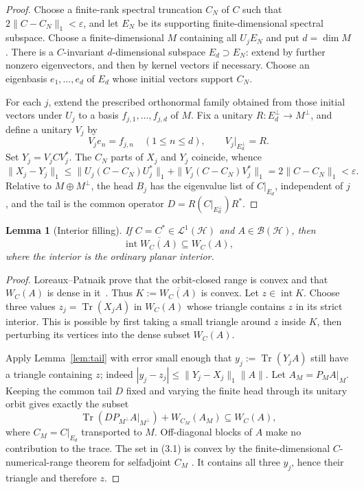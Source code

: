\documentclass[11pt]{article}
\newtheorem{lemma}[theorem]{Lemma}
\newcommand{\HH}{\mathcal H}
\newcommand{\B}{\mathcal B}
\newcommand{\Lone}{\mathcal L^1}
\newcommand{\Tr}{\operatorname{Tr}}
\newcommand{\clos}[1]{\overline{#1}}
\begin{document}
\begin{proof}
Choose a finite-rank spectral truncation $C_N$ of $C$ such that
$2\|C-C_N\|_1<\varepsilon$, and let $E_N$ be its supporting
finite-dimensional spectral subspace.  Choose a finite-dimensional $M$
containing all $U_jE_N$ and put $d=\dim M$.  There is a $C$-invariant
$d$-dimensional subspace $E_d\supset E_N$: extend by further nonzero
eigenvectors, and then by kernel vectors if necessary.  Choose an eigenbasis
$e_1,\ldots,e_d$ of $E_d$ whose initial vectors support $C_N$.

For each $j$, extend the prescribed orthonormal family obtained from those
initial vectors under $U_j$ to a basis $f_{j,1},\ldots,f_{j,d}$ of $M$.
Fix a unitary $R:E_d^\perp\to M^\perp$, and define a unitary $V_j$ by
\[
  V_je_n=f_{j,n}\quad(1\leq n\leq d),
  \qquad V_j|_{E_d^\perp}=R.
\]
Set $Y_j=V_jCV_j^*$.  The $C_N$ parts of $X_j$ and $Y_j$ coincide, whence
\[
 \|X_j-Y_j\|_1
 \leq \|U_j(C-C_N)U_j^*\|_1+\|V_j(C-C_N)V_j^*\|_1
 =2\|C-C_N\|_1<\varepsilon.
\]
Relative to $M\oplus M^\perp$, the head $B_j$ has the eigenvalue list of
$C|_{E_d}$, independent of $j$, and the tail is the common operator
$D=R(C|_{E_d^\perp})R^*$.
\end{proof}

\begin{lemma}[Interior filling]\label{lem:interior}
If $C=C^*\in\Lone(\HH)$ and $A\in\B(\HH)$, then
\[
  \operatorname{int}\clos{W_C(A)}\subseteq W_C(A),
\]
where the interior is the ordinary planar interior.
\end{lemma}

\begin{proof}
Loreaux--Patnaik prove that the orbit-closed range is convex
and that $W_C(A)$ is dense in it~\cite[Theorem 3.4 and Corollary 4.6]{LP}.
Thus $K:=\clos{W_C(A)}$ is convex.  Let $z\in\operatorname{int}K$.
Choose three values $z_j=\Tr(X_jA)$ in $W_C(A)$ whose triangle contains $z$
in its strict interior.  This is possible by first taking a small triangle
around $z$ inside $K$, then perturbing its vertices into the dense subset
$W_C(A)$.

Apply Lemma~\ref{lem:tail} with error small enough that
$y_j:=\Tr(Y_jA)$ still have a triangle containing $z$; indeed
$|y_j-z_j|\leq\|Y_j-X_j\|_1\|A\|$.  Let $A_M=P_MA|_M$.  Keeping the common
tail $D$ fixed and varying the finite head through its unitary orbit gives
exactly the subset
\[
  \Tr(DP_{M^\perp}A|_{M^\perp})+W_{C_M}(A_M)
  \subseteq W_C(A),                                      \tag{3.1}
\]
where $C_M=C|_{E_d}$ transported to $M$.  Off-diagonal blocks of $A$ make no
contribution to the trace.  The set in (3.1) is convex by the
finite-dimensional $C$-numerical-range theorem for selfadjoint $C_M$
\cite{Westwick,Poon}.  It contains all three $y_j$, hence their triangle and
therefore $z$.
\end{proof}
\end{document}
